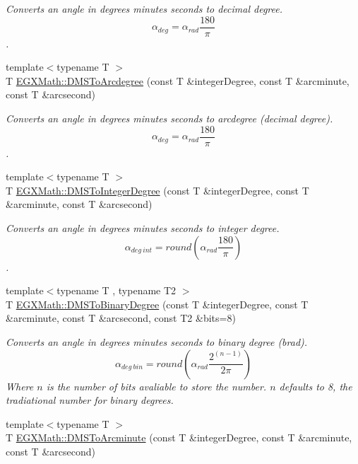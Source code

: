 \begin{DoxyCompactItemize}
\begin{DoxyCompactList}\small\item\em Converts an angle in degrees minutes seconds to decimal degree. \[\alpha_{deg}=\alpha_{rad}\frac{180}{\pi}\]. \end{DoxyCompactList}\item 
{\footnotesize template$<$typename T $>$ }\\T \mbox{\hyperlink{group___e_g_x_math-_angle_conversions-_d_m_s_ga641f46ead1a3f19312aab422e569b810}{E\+G\+X\+Math\+::\+D\+M\+S\+To\+Arcdegree}} (const T \&integer\+Degree, const T \&arcminute, const T \&arcsecond)
\begin{DoxyCompactList}\small\item\em Converts an angle in degrees minutes seconds to arcdegree (decimal degree). \[\alpha_{deg}=\alpha_{rad}\frac{180}{\pi}\]. \end{DoxyCompactList}\item 
{\footnotesize template$<$typename T $>$ }\\T \mbox{\hyperlink{group___e_g_x_math-_angle_conversions-_d_m_s_ga648345592a9116cccda50f476df28586}{E\+G\+X\+Math\+::\+D\+M\+S\+To\+Integer\+Degree}} (const T \&integer\+Degree, const T \&arcminute, const T \&arcsecond)
\begin{DoxyCompactList}\small\item\em Converts an angle in degrees minutes seconds to integer degree. \[\alpha_{deg\ int}=round(\alpha_{rad}\frac{180}{\pi})\]. \end{DoxyCompactList}\item 
{\footnotesize template$<$typename T , typename T2 $>$ }\\T \mbox{\hyperlink{group___e_g_x_math-_angle_conversions-_d_m_s_gae0b9627dc69707dd6febb80306318d9a}{E\+G\+X\+Math\+::\+D\+M\+S\+To\+Binary\+Degree}} (const T \&integer\+Degree, const T \&arcminute, const T \&arcsecond, const T2 \&bits=8)
\begin{DoxyCompactList}\small\item\em Converts an angle in degrees minutes seconds to binary degree (brad). \[\alpha_{deg\ bin}=round(\alpha_{rad}\frac{2^{(n-1)}}{2 \pi})\] Where $n$ is the number of bits avaliable to store the number. $n$ defaults to 8, the tradiational number for binary degrees. \end{DoxyCompactList}\item 
{\footnotesize template$<$typename T $>$ }\\T \mbox{\hyperlink{group___e_g_x_math-_angle_conversions-_d_m_s_gab0fa9a734b22ff812a83a7784280d6db}{E\+G\+X\+Math\+::\+D\+M\+S\+To\+Arcminute}} (const T \&integer\+Degree, const T \&arcminute, const T \&arcsecond)

\end{DoxyCompactItemize}
